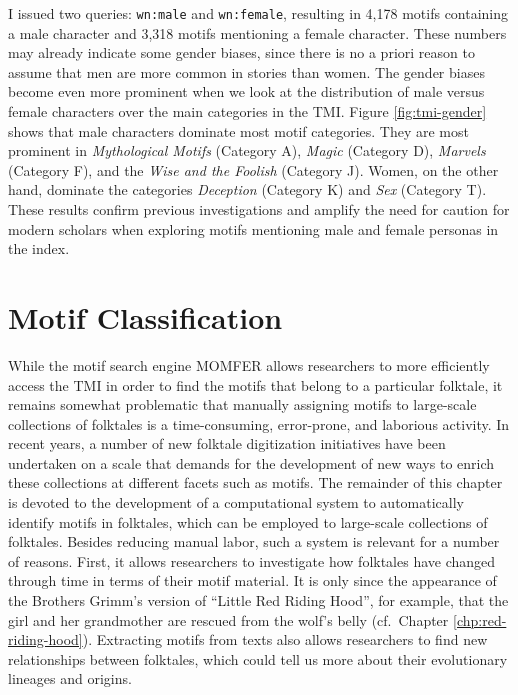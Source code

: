 I issued two queries: \texttt{wn:male} and \texttt{wn:female}, resulting in 4,178 motifs containing a male character and 3,318 motifs mentioning a female character. These numbers may already indicate some gender biases, since there is no a priori reason to assume that men are more common in stories than women. The gender biases become even more prominent when we look at the distribution of male versus female characters over the main categories in the TMI. Figure \ref{fig:tmi-gender} shows that male characters dominate most motif categories. They are most prominent in \emph{Mythological Motifs} (Category A), \emph{Magic} (Category D), \emph{Marvels} (Category F), and the \emph{Wise and the Foolish} (Category J). Women, on the other hand, dominate the categories \emph{Deception} (Category K) and \emph{Sex} (Category T). These results confirm previous investigations and amplify the need for caution for modern scholars when exploring motifs mentioning male and female personas in the index.

\section{Motif Classification}\label{sec:motif-classification}

While the motif search engine MOMFER allows researchers to more efficiently access the TMI in order to find the motifs that belong to a particular folktale, it remains somewhat problematic that manually assigning motifs to large-scale collections of folktales is a time-consuming, error-prone, and laborious activity. In recent years, a number of new folktale digitization initiatives have been undertaken on a scale that demands for the development of new ways to enrich these collections at different facets such as motifs.\autocite{abello:2012,barre:2012,meder:2010,meder:2016} The remainder of this chapter is devoted to the development of a computational system to automatically identify motifs in folktales, which can be employed to large-scale collections of folktales. Besides reducing manual labor, such a system is relevant for a number of reasons. First, it allows researchers to investigate how folktales have changed through time in terms of their motif material. It is only since the appearance of the Brothers Grimm's version of ``Little Red Riding Hood'', for example, that the girl and her grandmother are rescued from the wolf's belly (cf.\ Chapter \ref{chp:red-riding-hood}). Extracting motifs from texts also allows researchers to find new relationships between folktales, which could tell us more about their evolutionary lineages and origins. 

